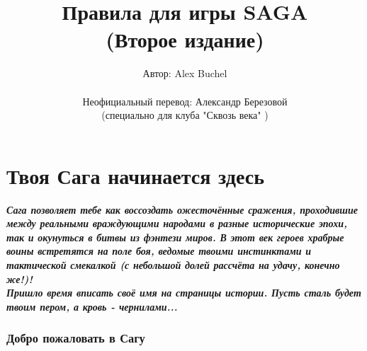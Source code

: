 \documentclass[a4paper,11pt,twoside]{article}
\title{\textbf{Правила для игры SAGA}\\ {\normalsize (Второе издание)}}
\author{Автор: Alex Buchel\\
		\\
		Неофициальный перевод: Александр Березовой \\
		(специально для клуба "Сквозь века" )}
\date{}
\begin{document}
\maketitle
\newpage
\tableofcontents
\newpage


\part*{Твоя Сага начинается здесь}

\begingroup
	\fontsize{13pt}{11pt}\selectfont
	\textbf{\textit{Сага позволяет тебе как воссоздать ожесточённые сражения, проходившие между реальными враждующими народами в разные исторические эпохи, так и окунуться в битвы из фэнтези миров. В этот век героев храбрые воины встретятся на поле боя, ведомые твоими инстинктами и тактической смекалкой (с небольшой долей рассчёта на удачу, конечно же!)! \\
	Пришло время вписать своё имя на страницы истории. Пусть сталь будет твоим пером, а кровь - чернилами...}}
\endgroup

\section*{Добро пожаловать в Сагу}
\end{document}
